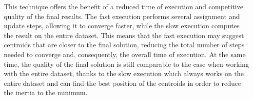 This technique offers the benefit of a reduced time of execution and competitive quality of the final results.
The fast execution performs several assignment and update steps, allowing it to converge faster, while the slow execution computes the result on the entire dataset. This means that the fast execution may suggest centroids that are closer to the final solution, reducing the total number of steps needed to converge and, consequently, the overall time of execution. 
At the same time, the quality of the final solution is still comparable to the case when working with the entire dataset, thanks to the slow execution which always works on the entire dataset and can find the best position of the centroids in order to reduce the inertia to the minimum.



